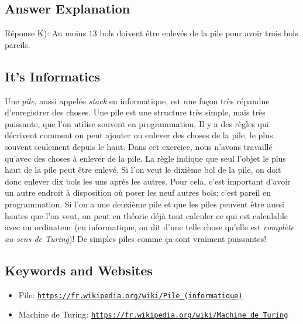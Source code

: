 \documentclass[a4paper,11pt]{report}
\newcommand{\BrochureUrlText}[1]{\texttt{#1}}
\newcommand{\taskGraphicsFolder}{..}
\begin{document}
\subsection*{Answer Explanation}

Réponse K): Au moins $13$ bols doivent être enlevés de la pile pour avoir trois bols pareils.

{\centering%
\par}


\subsection*{It’s Informatics}

Une \emph{pile}, aussi appelée \emph{stack} en informatique, est une façon très répandue d’enregistrer des choses. Une pile est une structure très simple, mais très puissante, que l’on utilise souvent en programmation. Il y a des règles qui décrivent comment on peut ajouter ou enlever des choses de la pile, le plus souvent seulement depuis le haut. Dans cet exercice, nous n’avons travaillé qu’avec des choses à enlever de la pile. La règle indique que seul l’objet le plus haut de la pile peut être enlevé. Si l’on veut le dixième bol de la pile, on doit donc enlever dix bols les uns après les autres. Pour cela, c’est important d’avoir un autre endroit à disposition où poser les neuf autres bols; c’est pareil en programmation. Si l’on a une deuxième pile et que les piles peuvent être aussi hautes que l’on veut, on peut en théorie déjà tout calculer ce qui est calculable avec un ordinateur (en informatique, on dit d’une telle chose qu’elle est \emph{complète au sens de Turing})! De simples piles comme ça sont vraiment puissantes!

{\raggedright

\subsection*{Keywords and Websites}

\begin{itemize}
  \item Pile: \href{https://fr.wikipedia.org/wiki/Pile_(informatique)}{\BrochureUrlText{https://fr.wikipedia.org/wiki/Pile\_(informatique)}}
  \item Machine de Turing: \href{https://fr.wikipedia.org/wiki/Machine_de_Turing}{\BrochureUrlText{https://fr.wikipedia.org/wiki/Machine\_de\_Turing}}
\end{itemize}


}
\end{document}
